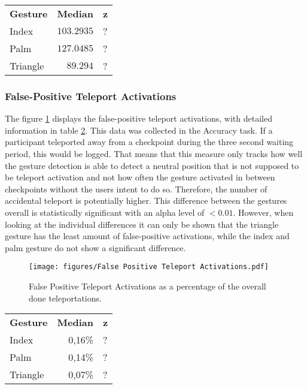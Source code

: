 \begin{table}[]
\centering
\begin{tabular}{lrl}
    \textbf{Gesture} & \multicolumn{1}{l}{\textbf{Median}} & \textbf{z} \\
    Index            & $103.2935$                            & ?      \\
    Palm             & $127.0485$                            & ?      \\
    Triangle         & $89.294$                              & ?     
    \label{tbl:taskCompletionTime}
\end{tabular}
\end{table}


\subsubsection{False-Positive Teleport Activations}
The figure \ref{fig:fpActivations} displays the false-positive teleport activations, with detailed information in table \ref{tbl:fpActivations}. This data was collected in the Accuracy task. If a participant teleported away from a checkpoint during the three second waiting period, this would be logged. That means that this measure only tracks how well the gesture detection is able to detect a neutral position that is not supposed to be teleport activation and not how often the gesture activated in between checkpoints without the users intent to do so. Therefore, the number of accidental teleport is potentially higher. This difference between the gestures overall is statistically significant with an alpha level of $<0.01$. However, when looking at the individual differences it can only be shown that the triangle gesture has the least amount of false-positive activations, while the index and palm gesture do not show a significant difference.

\begin{figure}[!h]
    \centering
    \texttt{[image: figures/False Positive Teleport Activations.pdf]}
    \caption{False Positive Teleport Activations as a percentage of the overall done teleportations.}
    \label{fig:fpActivations}
\end{figure}

\begin{table}[!h]
\centering
\begin{tabular}{lrl}
    \textbf{Gesture} & \multicolumn{1}{l}{\textbf{Median}} & \textbf{z} \\
    Index            & 0,16\%                                & ?          \\
    Palm             & 0,14\%                                & ?          \\
    Triangle         & 0,07\%                                & ?         
    \label{tbl:fpActivations}
\end{tabular}
\end{table}


